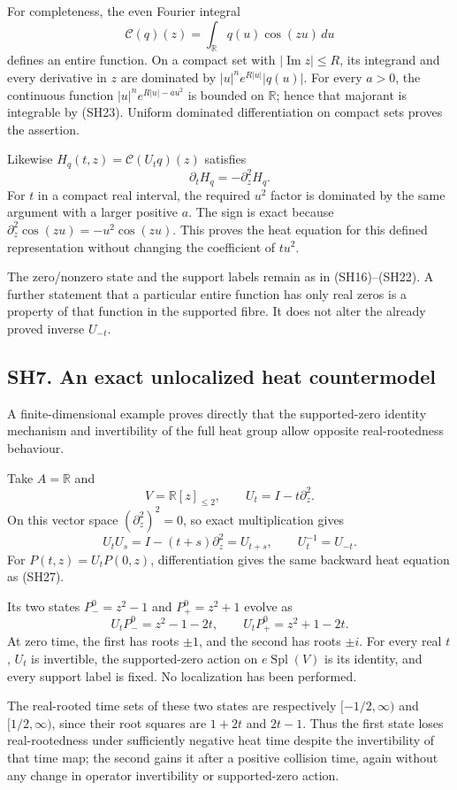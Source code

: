 \documentclass[
]{article}
\begin{document}
For completeness, the even Fourier integral \[
\mathcal C(q)(z)=\int_{\mathbb R}q(u)\cos(zu)\,du
\tag{SH26}
\] defines an entire function. On a compact set with
\(|\operatorname{Im}z|\le R\), its integrand and every derivative in
\(z\) are dominated by \(|u|^n e^{R|u|}|q(u)|\). For every \(a>0\), the
continuous function \(|u|^n e^{R|u|-a u^2}\) is bounded on
\(\mathbb R\); hence that majorant is integrable by (SH23). Uniform
dominated differentiation on compact sets proves the assertion.

Likewise \(H_q(t,z)=\mathcal C(U_tq)(z)\) satisfies \[
\partial_t H_q=-\partial_z^2H_q.
\tag{SH27}
\] For \(t\) in a compact real interval, the required \(u^2\) factor is
dominated by the same argument with a larger positive \(a\). The sign is
exact because \(\partial_z^2\cos(zu)=-u^2\cos(zu)\). This proves the
heat equation for this defined representation without changing the
coefficient of \(tu^2\).

The zero/nonzero state and the support labels remain as in
(SH16)--(SH22). A further statement that a particular entire function
has only real zeros is a property of that function in the supported
fibre. It does not alter the already proved inverse \(U_{-t}\).

\subsection{SH7. An exact unlocalized heat
countermodel}\label{sh7.-an-exact-unlocalized-heat-countermodel}

A finite-dimensional example proves directly that the supported-zero
identity mechanism and invertibility of the full heat group allow
opposite real-rootedness behaviour.

Take \(A=\mathbb R\) and \[
V=\mathbb R[z]_{\le2},\qquad
U_t=I-t\partial_z^2.
\tag{SH28}
\] On this vector space \((\partial_z^2)^2=0\), so exact multiplication
gives \[
U_tU_s=I-(t+s)\partial_z^2=U_{t+s},\qquad
U_t^{-1}=U_{-t}.
\] For \(P(t,z)=U_tP(0,z)\), differentiation gives the same backward
heat equation as (SH27).

Its two states \(P_-^0=z^2-1\) and \(P_+^0=z^2+1\) evolve as \[
U_tP_-^0=z^2-1-2t,\qquad
U_tP_+^0=z^2+1-2t.
\tag{SH29}
\] At zero time, the first has roots \(\pm1\), and the second has roots
\(\pm i\). For every real \(t\), \(U_t\) is invertible, the
supported-zero action on \(e\operatorname{Spl}(V)\) is its identity, and
every support label is fixed. No localization has been performed.

The real-rooted time sets of these two states are respectively
\([-1/2,\infty)\) and \([1/2,\infty)\), since their root squares are
\(1+2t\) and \(2t-1\). Thus the first state loses real-rootedness under
sufficiently negative heat time despite the invertibility of that time
map; the second gains it after a positive collision time, again without
any change in operator invertibility or supported-zero action.
\end{document}
